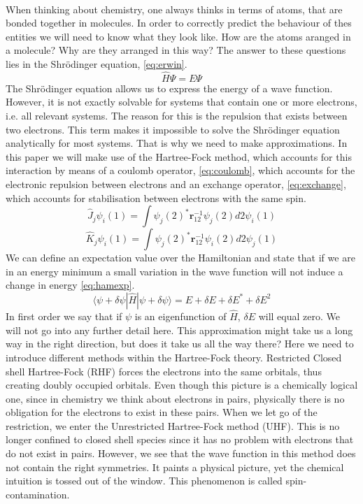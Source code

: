 \documentclass[twoside,twocolumn,9pt]{article}
\begin{document}
\paragraph*{}
When thinking about chemistry, one always thinks in terms of atoms, that are bonded together in molecules. In order to correctly predict the behaviour of 
thes entities we will need to know what they look like. How are the atoms aranged in a molecule? Why are they arranged in this way? The answer to these
questions lies in the Shrödinger equation, \eqref{eq:erwin}.
\begin{equation}\label{eq:erwin}
  \hat{H}\Psi = E\Psi
\end{equation} 
The Shrödinger equation allows us to express the energy of a wave function. However, it is not exactly solvable for systems that contain one or more electrons,
i.e. all relevant systems. The reason for this is the repulsion that exists between two electrons. This term makes it impossible to solve the Shrödinger equation
analytically for most systems. That is why we need to make approximations. In this paper we will make use of the Hartree-Fock method, which accounts for this
interaction by means of a coulomb operator, \eqref{eq:coulomb}, which accounts for the electronic repulsion between electrons and an exchange operator,
\eqref{eq:exchange}, which accounts for stabilisation between electrons with the same spin. 
\begin{equation}\label{eq:coulomb}
  \hat{J}_j\psi_i(1) = \int\psi_j(2)^*\boldsymbol{r}_{12}^{-1}\psi_j(2)d2 \psi_i(1)
\end{equation}
\begin{equation}\label{eq:exchange}
  \hat{K}_j\psi_i(1) = \int\psi_j(2)^*\boldsymbol{r}_{12}^{-1}\psi_i(2)d2 \psi_j(1)
\end{equation}
We can define an expectation value over the Hamiltonian and state that if we are in an energy minimum a small variation in the wave function will not induce a change
in energy \eqref{eq:hamexp}.
\begin{equation}\label{eq:hamexp}
  \langle\psi + \delta\psi|\hat{H}|\psi + \delta\psi \rangle = E + \delta E + \delta E^* + \delta E^2
\end{equation}
In first order we say that if $\psi$ is an eigenfunction of $\hat{H}$, $\delta E$ will equal zero. We will not go into any further detail here.
This approximation might take us a long way in the right direction, but does it take us all the way there? Here we need to introduce different methods within the
Hartree-Fock theory. Restricted Closed shell Hartree-Fock (RHF) forces the electrons into the same orbitals, thus creating doubly occupied orbitals. Even though this 
picture is a chemically logical one, since in chemistry we think about electrons in pairs, physically there is no obligation for the electrons to exist in these pairs.
When we let go of the restriction, we enter the Unrestricted Hartree-Fock method (UHF). This  is no longer confined to closed shell species since it has no problem with 
electrons that do not exist in pairs. However, we see that the wave function in this method does not contain the right symmetries. It paints a physical picture, yet the
chemical intuition is tossed out of the window. This phenomenon is called spin-contamination.
\end{document}
